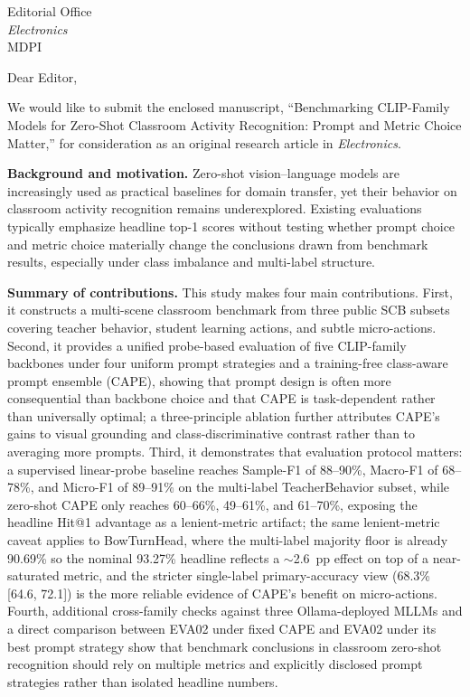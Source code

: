 \documentclass[11pt]{letter}
\date{April 27, 2026}
\begin{document}
\begin{letter}{Editorial Office \\ \textit{Electronics} \\ MDPI}

\opening{Dear Editor,}

We would like to submit the enclosed manuscript, ``Benchmarking CLIP-Family Models for Zero-Shot Classroom Activity Recognition: Prompt and Metric Choice Matter,'' for consideration as an original research article in \textit{Electronics}.

\textbf{Background and motivation.}
Zero-shot vision--language models are increasingly used as practical baselines for domain transfer, yet their behavior on classroom activity recognition remains underexplored. Existing evaluations typically emphasize headline top-1 scores without testing whether prompt choice and metric choice materially change the conclusions drawn from benchmark results, especially under class imbalance and multi-label structure.

\textbf{Summary of contributions.}
This study makes four main contributions. First, it constructs a multi-scene classroom benchmark from three public SCB subsets covering teacher behavior, student learning actions, and subtle micro-actions. Second, it provides a unified probe-based evaluation of five CLIP-family backbones under four uniform prompt strategies and a training-free class-aware prompt ensemble (CAPE), showing that prompt design is often more consequential than backbone choice and that CAPE is task-dependent rather than universally optimal; a three-principle ablation further attributes CAPE's gains to visual grounding and class-discriminative contrast rather than to averaging more prompts. Third, it demonstrates that evaluation protocol matters: a supervised linear-probe baseline reaches Sample-F1 of 88--90\%, Macro-F1 of 68--78\%, and Micro-F1 of 89--91\% on the multi-label TeacherBehavior subset, while zero-shot CAPE only reaches 60--66\%, 49--61\%, and 61--70\%, exposing the headline Hit@1 advantage as a lenient-metric artifact; the same lenient-metric caveat applies to BowTurnHead, where the multi-label majority floor is already 90.69\% so the nominal 93.27\% headline reflects a $\sim$2.6~pp effect on top of a near-saturated metric, and the stricter single-label primary-accuracy view (68.3\% [64.6, 72.1]) is the more reliable evidence of CAPE's benefit on micro-actions. Fourth, additional cross-family checks against three Ollama-deployed MLLMs and a direct comparison between EVA02 under fixed CAPE and EVA02 under its best prompt strategy show that benchmark conclusions in classroom zero-shot recognition should rely on multiple metrics and explicitly disclosed prompt strategies rather than isolated headline numbers.


\end{letter}
\end{document}
